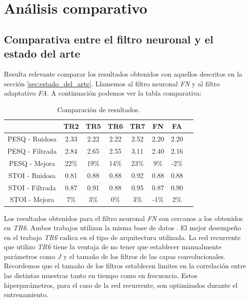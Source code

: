 \section{Análisis comparativo}

\subsection{Comparativa entre el filtro neuronal y el estado del arte}

Resulta relevante comparar los resultados obtenidos con aquellos descritos en la sección \ref{sec:estado_del_arte}. Llamemos al filtro neuronal \emph{FN} y al filtro adaptativo \emph{FA}. A continuación podemos ver la tabla comparativa:

\begin{table}[H]
	\centering
	\begin{tabular}{ |c|c|c|c|c|c|c|c| } 
		\hline
		& TR2 & TR5 & TR6 & TR7 & FN & FA \\ 
		\hline
		PESQ - Ruidosa & 2.33 & 2.22 & 2.22 & 2.52 & 2.20 & 2.20 \\
		PESQ - Filtrada & 2.84 & 2.65 & 2.55 & 3.11 & 2.40 & 2.16 \\
		PESQ - Mejora & 22\%  & 19\% & 14\% & 23\% & 9\% & -2\% \\
		\hline
		STOI - Ruidosa & 0.81 & 0.88 & 0.88 & 0.92 & 0.88 & 0.88 \\
		STOI - Filtrada & 0.87 & 0.91 & 0.88 & 0.95 & 0.87 & 0.90 \\
		STOI - Mejora & 7\% & 3\% & 0\% & 3\% & -1\% & 2\% \\
		\hline
	\end{tabular}
	\caption{Comparación de resultados.}
\end{table}

Los resultados obtenidos para el filtro neuronal \emph{FN} son cercanos a los obtenidos en \emph{TR6}. Ambos trabajos utilizan la misma base de datos \cite{a_scalable_noisy_speech_dataset_and_online_subjective_test_framework}. El mejor desempeño en el trabajo \emph{TR6} radica en el tipo de arquitectura utilizada. La red recurrente que utilizo \emph{TR6} tiene la ventaja de no tener que establecer manualmente parámetros como $J$ y el tamaño de los filtros de las capas convolucionales. Recordemos que el tamaño de los filtros establecen limites en la correlación entre las distintas muestras tanto en tiempo como en frecuencia. Estos hiperparámetros, para el caso de la red recurrente, son optimizados durante el entrenamiento. 

